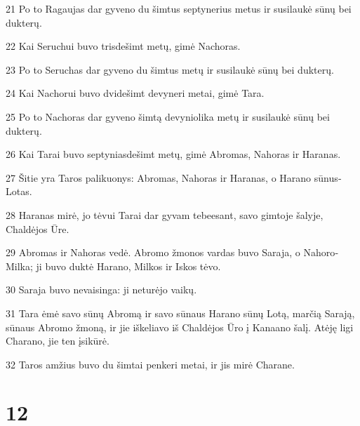 \par 21 Po to Ragaujas dar gyveno du šimtus septynerius metus ir susilaukė sūnų bei dukterų. 
\par 22 Kai Seruchui buvo trisdešimt metų, gimė Nachoras. 
\par 23 Po to Seruchas dar gyveno du šimtus metų ir susilaukė sūnų bei dukterų. 
\par 24 Kai Nachorui buvo dvidešimt devyneri metai, gimė Tara. 
\par 25 Po to Nachoras dar gyveno šimtą devyniolika metų ir susilaukė sūnų bei dukterų. 
\par 26 Kai Tarai buvo septyniasdešimt metų, gimė Abromas, Nahoras ir Haranas. 
\par 27 Šitie yra Taros palikuonys: Abromas, Nahoras ir Haranas, o Harano sūnus­Lotas. 
\par 28 Haranas mirė, jo tėvui Tarai dar gyvam tebeesant, savo gimtoje šalyje, Chaldėjos Ūre. 
\par 29 Abromas ir Nahoras vedė. Abromo žmonos vardas buvo Saraja, o Nahoro­Milka; ji buvo duktė Harano, Milkos ir Iskos tėvo. 
\par 30 Saraja buvo nevaisinga: ji neturėjo vaikų. 
\par 31 Tara ėmė savo sūnų Abromą ir savo sūnaus Harano sūnų Lotą, marčią Sarają, sūnaus Abromo žmoną, ir jie iškeliavo iš Chaldėjos Ūro į Kanaano šalį. Atėję ligi Charano, jie ten įsikūrė. 
\par 32 Taros amžius buvo du šimtai penkeri metai, ir jis mirė Charane.



\chapter{12}

